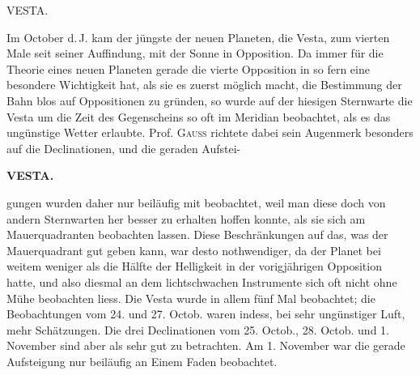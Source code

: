 \par{}\bigskip
\hypertarget{native-366-lower}{}\label{native-366-lower}
\begin{center}
\large VESTA.
\end{center}

\par\indent Im October d.\,J. kam der jüngste der neuen Planeten, die Vesta, zum vierten Male seit seiner
Auffindung, mit der Sonne in Opposition. Da immer für die Theorie eines neuen Planeten gerade die
vierte Opposition in so fern eine besondere Wichtigkeit hat, als sie es zuerst möglich macht, die
Bestimmung der Bahn blos auf Oppositionen zu gründen, so wurde auf der hiesigen Sternwarte die Vesta
um die Zeit des Gegenscheins so oft im Meridian beobachtet, als es das ungünstige Wetter erlaubte.
Prof. \textsc{Gauss} richtete dabei sein Augenmerk besonders auf die Declinationen, und die geraden Aufstei-
\par
{}
\clearpage
\thispagestyle{empty}
\noindent{}%
%
\parbox[t]{\dimexpr\linewidth-24mm\relax}{\centering\footnotesize\bfseries VESTA.\par}%
\makebox[12mm][r]{}\par\nobreak\medskip
\noindent gungen wurden daher nur beiläufig mit beobachtet, weil man diese doch von andern Sternwarten her
besser zu erhalten hoffen konnte, als sie sich am Mauerquadranten beobachten lassen. Diese Beschränkungen
auf das, was der Mauerquadrant gut geben kann, war desto nothwendiger, da der Planet bei weitem weniger
als die Hälfte der Helligkeit in der vorigjährigen Opposition hatte, und also diesmal an dem
lichtschwachen Instrumente sich oft nicht ohne Mühe beobachten liess. Die Vesta wurde in allem fünf
Mal beobachtet; die Beobachtungen vom 24. und 27. Octob. waren indess, bei sehr ungünstiger Luft,
mehr Schätzungen. Die drei Declinationen vom 25. Octob., 28. Octob. und 1. November sind aber als
sehr gut zu betrachten. Am 1. November war die gerade Aufsteigung nur beiläufig an Einem Faden
beobachtet.

